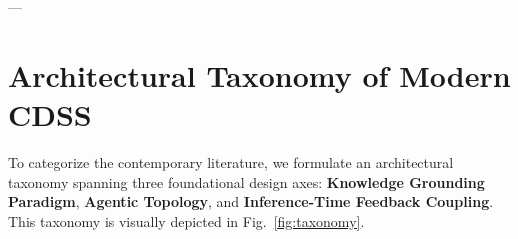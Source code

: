 \documentclass[conference]{IEEEtran}
\begin{document}
---

\section{Architectural Taxonomy of Modern CDSS}

To categorize the contemporary literature, we formulate an architectural taxonomy spanning three foundational design axes: \textbf{Knowledge Grounding Paradigm}, \textbf{Agentic Topology}, and \textbf{Inference-Time Feedback Coupling}. This taxonomy is visually depicted in Fig.~\ref{fig:taxonomy}.

\begin{figure}[t]
\centering
{}
\end{figure}
\end{document}
